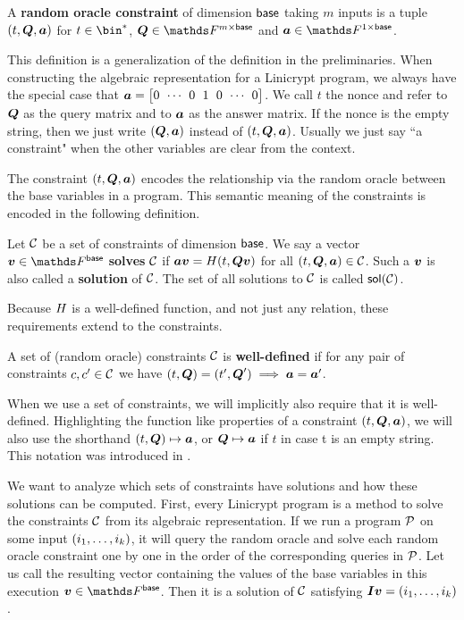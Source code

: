 \begin{defn}
A \textbf{random oracle constraint} of dimension $\base$ taking $m$ inputs is a tuple $(t, \v Q, \v a)$ for
$t \in \bin^*$, $\Q \in \F^{m \times \base}$ and $\va \in \F^{1 \times \base}$.
\end{defn}

This definition is a generalization of the definition in the preliminaries.
When constructing the algebraic representation for a Linicrypt program,
we always have the special case that $\va = \m{0&\cdots&0&1&0&\cdots&0}$.
We call $t$ the nonce and refer to $\Q$ as the query matrix and to $\va$ as the answer matrix.
If the nonce is the empty string, then we just write $(\Q, \va)$ instead of $(t, \Q, \va)$.
Usually we just say ``a constraint" when the other variables are clear from the context.

The constraint $(t, \Q, \va)$ encodes the relationship via the random oracle between the base variables in a program.
This semantic meaning of the constraints is encoded in the following definition.
\begin{defn}
    Let $\C$ be a set of constraints of dimension $\base$.
    We say a vector $\vv \in \Base$ \textbf{solves} $\C$ if
    $\va \vv = \H(t, \Q \vv)$ for all $(t, \Q, \va) \in \C$.
    Such a $\vv$ is also called a \textbf{solution} of $\C$.
    The set of all solutions to $\C$ is called $\sol(\C)$.
\end{defn}

Because $\H$ is a well-defined function,
and not just any relation,
these requirements extend to the constraints.

\begin{defn}
A set of (random oracle) constraints $\C$ is \textbf{well-defined} if for any pair of constraints 
$c, c' \in \C$ we have $(t,\Q) = (t', \Q') \implies \va = \va'$.
\end{defn}

When we use a set of constraints, we will implicitly also require that it is well-defined.
Highlighting the function like properties of a constraint $(t, \Q, \va)$,
we will also use the shorthand $(t,\Q) \mapsto \va$, or $\Q \mapsto \va$ if $t$ in case t is an empty string.
This notation was introduced in \cite{EPRINT:HolRosRoy22}.

We want to analyze which sets of constraints have solutions and how these solutions can be computed.
First, every Linicrypt program is a method to solve the constraints $\C$ from its algebraic representation.
If we run a program $\P$ on some input $(\dts i k)$,
it will query the random oracle
and solve each random oracle constraint one by one in the order of the corresponding queries in $\P$.
Let us call the resulting vector containing the values of the base variables in this execution $\vv \in \Fsp$.
Then it is a solution of $\C$ satisfying $\I\vv = (\dts i k)$.

